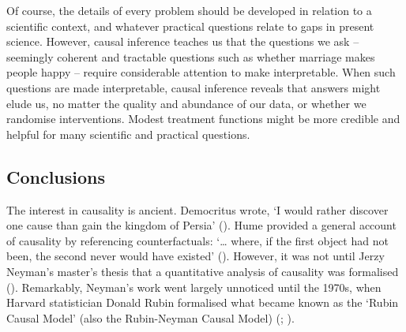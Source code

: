 \documentclass[
  single column]{article}
\begin{document}
Of course, the details of every problem should be developed in relation
to a scientific context, and whatever practical questions relate to gaps
in present science. However, causal inference teaches us that the
questions we ask -- seemingly coherent and tractable questions such as
whether marriage makes people happy -- require considerable attention to
make interpretable. When such questions are made interpretable, causal
inference reveals that answers might elude us, no matter the quality and
abundance of our data, or whether we randomise interventions. Modest
treatment functions might be more credible and helpful for many
scientific and practical questions.

\subsection{Conclusions}\label{id-sec-5}

The interest in causality is ancient. Democritus wrote, `I would rather
discover one cause than gain the kingdom of Persia'
(). Hume provided a
general account of causality by referencing counterfactuals: `\ldots{}
where, if the first object had not been, the second never would have
existed' (). However, it was not until
Jerzy Neyman's master's thesis that a quantitative analysis of causality
was formalised (). Remarkably, Neyman's work went largely unnoticed until the
1970s, when Harvard statistician Donald Rubin formalised what became
known as the `Rubin Causal Model' (also the Rubin-Neyman Causal Model)
(;
).
\end{document}
